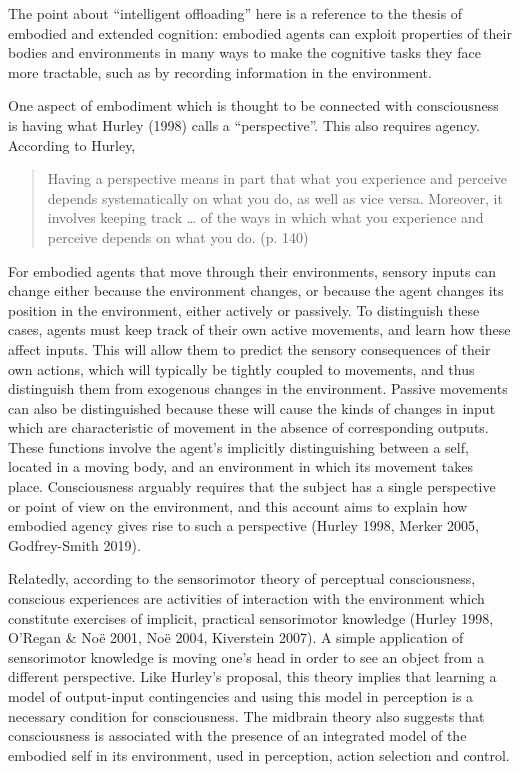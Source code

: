 \documentclass[12pt]{article}
\newenvironment{myquote}
  {\begin{quote}\leftskip=1cm\rightskip=1cm}
  {\end{quote}}
\begin{document}
The point about ``intelligent offloading'' here is a reference to the thesis of embodied and extended cognition: embodied agents can exploit properties of their bodies and environments in many ways to make the cognitive tasks they face more tractable, such as by recording information in the environment.

One aspect of embodiment which is thought to be connected with consciousness is having what Hurley (1998) calls a ``perspective''. This also requires agency. According to Hurley,

\begin{myquote}
Having a perspective means in part that what you experience and perceive depends systematically on what you do, as well as vice versa. Moreover, it involves keeping track … of the ways in which what you experience and perceive depends on what you do. (p. 140)
\end{myquote}

For embodied agents that move through their environments, sensory inputs can change either because the environment changes, or because the agent changes its position in the environment, either actively or passively. To distinguish these cases, agents must keep track of their own active movements, and learn how these affect inputs. This will allow them to predict the sensory consequences of their own actions, which will typically be tightly coupled to movements, and thus distinguish them from exogenous changes in the environment. Passive movements can also be distinguished because these will cause the kinds of changes in input which are characteristic of movement in the absence of corresponding outputs. These functions involve the agent’s implicitly distinguishing between a self, located in a moving body, and an environment in which its movement takes place. Consciousness arguably requires that the subject has a single perspective or point of view on the environment, and this account aims to explain how embodied agency gives rise to such a perspective (Hurley 1998, Merker 2005, Godfrey-Smith 2019).

Relatedly, according to the sensorimotor theory of perceptual consciousness, conscious experiences are activities of interaction with the environment which constitute exercises of implicit, practical sensorimotor knowledge (Hurley 1998, O’Regan \& Noë 2001, Noë 2004, Kiverstein 2007). A simple application of sensorimotor knowledge is moving one’s head in order to see an object from a different perspective. Like Hurley’s proposal, this theory implies that learning a model of output-input contingencies and using this model in perception is a necessary condition for consciousness. The midbrain theory also suggests that consciousness is associated with the presence of an integrated model of the embodied self in its environment, used in perception, action selection and control.
\end{document}
